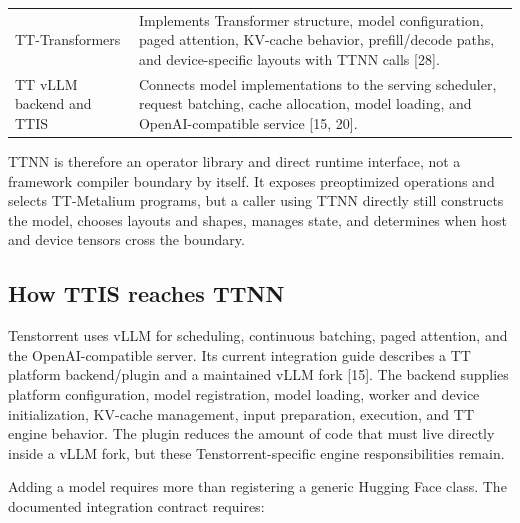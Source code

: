 \documentclass[
  10pt,
  american,
  10pt,
  letterpaper]{article}
\begin{document}
\begin{longtable}[]{@{}ll@{}}
\begin{minipage}[t]{0.47\columnwidth}\raggedright
TT-Transformers\strut
\end{minipage} & \begin{minipage}[t]{0.47\columnwidth}\raggedright
Implements Transformer structure, model configuration, paged attention,
KV-cache behavior, prefill/decode paths, and device-specific layouts
with TTNN calls {[}28{]}.\strut
\end{minipage}\tabularnewline
\begin{minipage}[t]{0.47\columnwidth}\raggedright
TT vLLM backend and TTIS\strut
\end{minipage} & \begin{minipage}[t]{0.47\columnwidth}\raggedright
Connects model implementations to the serving scheduler, request
batching, cache allocation, model loading, and OpenAI-compatible service
{[}15, 20{]}.\strut
\end{minipage}\tabularnewline
\bottomrule
\end{longtable}

TTNN is therefore an operator library and direct runtime interface, not
a framework compiler boundary by itself. It exposes preoptimized
operations and selects TT-Metalium programs, but a caller using TTNN
directly still constructs the model, chooses layouts and shapes, manages
state, and determines when host and device tensors cross the boundary.

\hypertarget{how-ttis-reaches-ttnn}{%
\subsection{How TTIS reaches TTNN}\label{how-ttis-reaches-ttnn}}

Tenstorrent uses vLLM for scheduling, continuous batching, paged
attention, and the OpenAI-compatible server. Its current integration
guide describes a TT platform backend/plugin and a maintained vLLM fork
{[}15{]}. The backend supplies platform configuration, model
registration, model loading, worker and device initialization, KV-cache
management, input preparation, execution, and TT engine behavior. The
plugin reduces the amount of code that must live directly inside a vLLM
fork, but these Tenstorrent-specific engine responsibilities remain.

Adding a model requires more than registering a generic Hugging Face
class. The documented integration contract requires:
\end{document}

